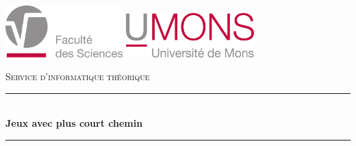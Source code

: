 \documentclass[12pt,a4paper]{report}
\theoremstyle{definition}%
\theoremstyle{remark}
\begin{document}
\begin{titlepage}
	
	\newcommand{\HRule}{\rule{\linewidth}{0.5mm}} %
	
	\center %
	

	\begin{center}
	\includegraphics[height=2cm]{logos/UMONS_FS.pdf}
	\hspace{5cm}
	\includegraphics[height=1.7cm]{logos/UMONS+txt}
	\\[1em]
	\vspace{1cm}
	\end{center}
	\textsc{\large Service d'informatique théorique }\\[0.5cm] %
	
	
	\vspace{0.5cm}
	\HRule \\[0.4cm]
	{ \huge \bfseries Jeux avec plus court chemin}\\[0.4cm] %
	\HRule \\[1cm]
	

\end{titlepage}
\end{document}
